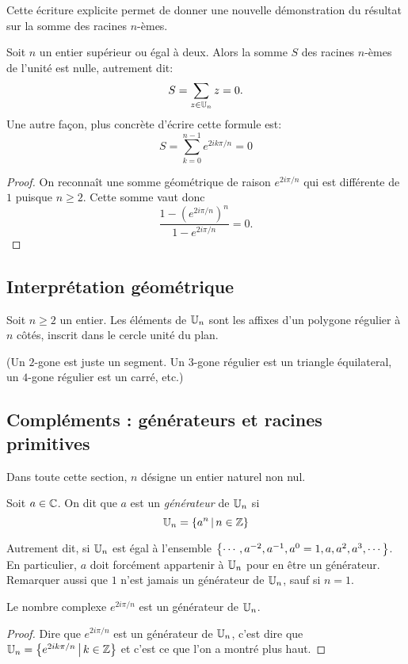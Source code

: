 Cette écriture explicite permet de donner une nouvelle démonstration du résultat sur la somme des racines $n$-èmes.

\begin{proposition}
Soit $n$ un entier supérieur ou égal à deux. Alors la somme $S$ des racines $n$-èmes de l'unité est nulle, autrement dit:
\[ S=\sum_{z\in \mathbb{U}_n}z = 0.\]
Une autre façon, plus concrète d'écrire cette formule est:
\[ S=\sum_{k=0}^{n-1}e^{2ik\pi/n} = 0\]
\end{proposition}
\begin{proof}
On reconnaît une somme géométrique de raison $e^{2i\pi/n}$ qui est différente de $1$ puisque $n\geq 2$. Cette somme vaut donc
\[ \frac{1-\left(e^{2i\pi/n}\right)^n}{1-e^{2i\pi/n}} = 0.\]
\end{proof}

\subsection{Interprétation géométrique}

\begin{proposition}Soit $n\geq 2$ un entier. 
Les éléments de $\mathbb{U}_n$ sont les affixes d'un polygone régulier à $n$ côtés, inscrit dans le cercle unité du plan.
\end{proposition}

(Un $2$-gone est juste un segment. Un $3$-gone régulier est un triangle équilateral, un $4$-gone régulier est un carré, etc.)


\subsection{Compléments : générateurs et racines primitives}

Dans toute cette section, $n$ désigne un entier naturel non nul.

\begin{definition}
Soit $a\in\mathbb{C}$. On dit que $a$ est un \emph{générateur} de $\mathbb{U}_n$ si
\[ \U_n = \ensemble{a^n}{n\in\Z}\]
\end{definition}

Autrement dit, si $\mathbb{U}_n$ est égal à l'ensemble $\left\{\cdots , a^{-2}, a^{-1}, a^0=1, a, a^2, a^3, \cdots\right\}$. En particulier, $a$ doit forcément appartenir à $\mathbb{U}_n$ pour en être un générateur. Remarquer aussi que $1$ n'est jamais un générateur de $\mathbb{U}_n$, sauf si $n=1$.

\begin{proposition}
Le nombre complexe $e^{2i\pi/n}$ est un générateur de $\mathbb{U}_n$.
\end{proposition}
\begin{proof}
Dire que $e^{2i\pi/n}$ est un générateur de $\mathbb{U}_n$, c'est dire que $\U_n=\ensemble{e^{2ik\pi/n}}{k\in \Z}$ et c'est ce que l'on a montré plus haut.
\end{proof}


